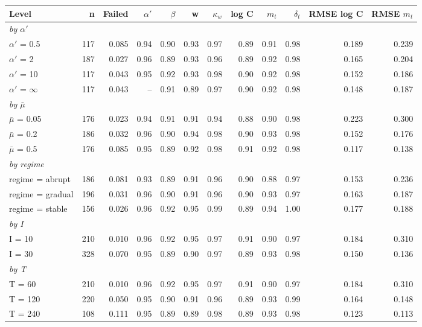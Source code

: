 \documentclass[10pt,a4paper]{article}
\begin{document}
\noindent\begin{minipage}{\linewidth}
\label{tab:S4}
\centering\scriptsize
\begin{tabular}{lrrrrrrrrrrr}
\toprule
Level & n & Failed & $\alpha'$ & $\beta$ & w & $\kappa_w$ & log C & $m_t$ & $\delta_t$ & RMSE log C & RMSE $m_t$ \\ \midrule
\multicolumn{12}{l}{\itshape by $\alpha'$} \\
$\alpha'$ = 0.5 & 117 & 0.085 & 0.94 & 0.90 & 0.93 & 0.97 & 0.89 & 0.91 & 0.98 & 0.189 & 0.239 \\
$\alpha'$ = 2 & 187 & 0.027 & 0.96 & 0.89 & 0.93 & 0.96 & 0.89 & 0.92 & 0.98 & 0.165 & 0.204 \\
$\alpha'$ = 10 & 117 & 0.043 & 0.95 & 0.92 & 0.93 & 0.98 & 0.90 & 0.92 & 0.98 & 0.152 & 0.186 \\
$\alpha'$ = $\infty$ & 117 & 0.043 & – & 0.91 & 0.89 & 0.97 & 0.90 & 0.92 & 0.98 & 0.148 & 0.187 \\
\multicolumn{12}{l}{\itshape by $\bar{\mu}$} \\
$\bar{\mu}$ = 0.05 & 176 & 0.023 & 0.94 & 0.91 & 0.91 & 0.94 & 0.88 & 0.90 & 0.98 & 0.223 & 0.300 \\
$\bar{\mu}$ = 0.2 & 186 & 0.032 & 0.96 & 0.90 & 0.94 & 0.98 & 0.90 & 0.93 & 0.98 & 0.152 & 0.176 \\
$\bar{\mu}$ = 0.5 & 176 & 0.085 & 0.95 & 0.89 & 0.92 & 0.98 & 0.91 & 0.92 & 0.98 & 0.117 & 0.138 \\
\multicolumn{12}{l}{\itshape by regime} \\
regime = abrupt & 186 & 0.081 & 0.93 & 0.89 & 0.91 & 0.96 & 0.90 & 0.88 & 0.97 & 0.153 & 0.236 \\
regime = gradual & 196 & 0.031 & 0.96 & 0.90 & 0.91 & 0.96 & 0.90 & 0.93 & 0.97 & 0.163 & 0.187 \\
regime = stable & 156 & 0.026 & 0.96 & 0.92 & 0.95 & 0.99 & 0.89 & 0.94 & 1.00 & 0.177 & 0.188 \\
\multicolumn{12}{l}{\itshape by I} \\
I = 10 & 210 & 0.010 & 0.96 & 0.92 & 0.95 & 0.97 & 0.91 & 0.90 & 0.97 & 0.184 & 0.310 \\
I = 30 & 328 & 0.070 & 0.95 & 0.89 & 0.90 & 0.97 & 0.89 & 0.93 & 0.98 & 0.150 & 0.136 \\
\multicolumn{12}{l}{\itshape by T} \\
T = 60 & 210 & 0.010 & 0.96 & 0.92 & 0.95 & 0.97 & 0.91 & 0.90 & 0.97 & 0.184 & 0.310 \\
T = 120 & 220 & 0.050 & 0.95 & 0.90 & 0.91 & 0.96 & 0.89 & 0.93 & 0.99 & 0.164 & 0.148 \\
T = 240 & 108 & 0.111 & 0.95 & 0.89 & 0.89 & 0.98 & 0.89 & 0.93 & 0.98 & 0.123 & 0.113 \\
\bottomrule
\end{tabular}
\end{minipage}
\vspace{22pt}
\end{document}
